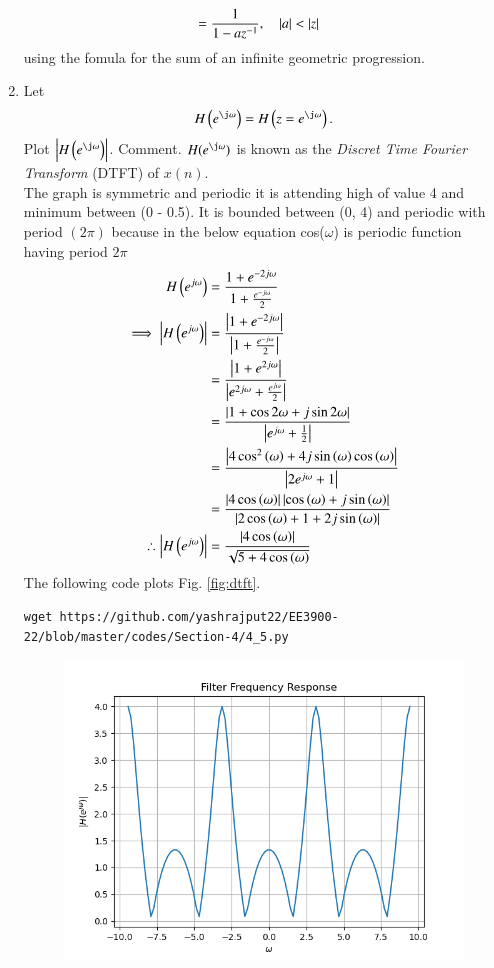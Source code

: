 \documentclass[journal,12pt,twocolumn]{IEEEtran}
\renewcommand\thesection{\arabic{section}}
\begin{document}
\begin{enumerate}[label=\thesection.\arabic*]
\begin{align}
\\
&= \frac{1}{1-az^{-1}} , \quad \left\vert a\right\vert < \left\vert z\right\vert
\end{align}
using the fomula for the sum of an infinite geometric progression.
%
\item 
Let
\begin{equation}
H\brak{e^{\j \omega}} = H\brak{z = e^{\j \omega}}.
\end{equation}
Plot $\abs{H\brak{e^{\j \omega}}}$.  Comment.  $H(e^{\j \omega})$ is
known as the {\em Discret Time Fourier Transform} (DTFT) of $x(n)$.
\\
\solution  The graph is symmetric and periodic it is attending high of value 4 and minimum between (0 - 0.5). 
It is bounded between (0, 4) and periodic with period $(2\pi)$ because in the below equation cos($\omega$) is periodic function having period $2\pi$
\\
\begin{align}
	H\left(e^{j \omega}\right) &= \frac{1+e^{-2j\omega}}{1 + \frac{e^{-j\omega}}{2}}\\
	  \implies \left\vert H\left(e^{j \omega}\right)\right\vert &= \frac{\left\vert1+e^{-2j\omega}\right\vert}{\left\vert1 + \frac{e^{-j\omega}}{2}\right\vert}\\
						  &= \frac{\left\vert1+e^{2j\omega}\right\vert}{\left\vert e^{2j\omega} + \frac{e^{j\omega}}{2}\right\vert}\\
						  &= \frac{\left\vert1+\cos2\omega + j\sin2\omega\right\vert}{\left\vert e^{j\omega}+ \frac{1}{2}\right\vert}\\
						  &= \frac{\left\vert4\cos^2\left(\omega\right) + 4j\sin\left(\omega\right)\cos\left(\omega\right)\right\vert}{\left\vert2e^{j\omega} + 1\right\vert}\\
						  &= \frac{\left\vert4\cos\left(\omega\right)\right\vert\left\vert\cos\left(\omega\right) + j\sin\left(\omega\right)\right\vert}{\left\vert2\cos\left(\omega\right) + 1 + 2j\sin\left(\omega\right)\right\vert}\\
	  \therefore \left\vert H\left(e^{j \omega}\right)\right\vert &= \frac{\left\vert4\cos\left(\omega\right)\right\vert}{\sqrt{5 +4\cos\left(\omega\right)}}
  \end{align}
The following code plots Fig. \ref{fig:dtft}.
\begin{lstlisting}
wget https://github.com/yashrajput22/EE3900-22/blob/master/codes/Section-4/4_5.py
\end{lstlisting}
\begin{figure}[!ht]
\centering
\includegraphics[width=\columnwidth]{./figs/4_5}

\end{figure}
\end{enumerate}
\end{document}
